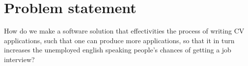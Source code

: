 \section{Problem statement}\label{sec:problem}
How do we make a software solution that effectivities the process of writing CV applications, such that one can produce more applications, 
so that it in turn increases the unemployed english speaking people's chances of getting a job interview?